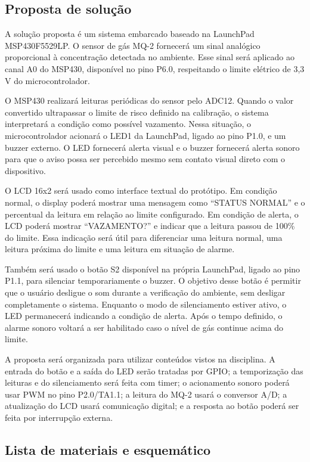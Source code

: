 \documentclass[11pt,a4paper]{article}
\numberwithin{equation}{section}
\begin{document}
\subsection{Proposta de solução}

A solução proposta é um sistema embarcado baseado na LaunchPad MSP430F5529LP. O sensor de gás MQ-2
fornecerá um sinal analógico proporcional à concentração detectada no ambiente. Esse sinal será
aplicado ao canal A0 do MSP430, disponível no pino P6.0, respeitando o limite elétrico de 3,3 V do
microcontrolador.

O MSP430 realizará leituras periódicas do sensor pelo ADC12. Quando o valor convertido ultrapassar o
limite de risco definido na calibração, o sistema interpretará a condição como possível vazamento.
Nessa situação, o microcontrolador acionará o LED1 da LaunchPad, ligado ao pino P1.0, e um buzzer
externo. O LED fornecerá alerta visual e o buzzer fornecerá alerta sonoro para que o aviso possa ser
percebido mesmo sem contato visual direto com o dispositivo.

O LCD 16x2 será usado como interface textual do protótipo. Em condição normal, o display poderá
mostrar uma mensagem como ``STATUS NORMAL'' e o percentual da leitura em relação ao limite
configurado. Em condição de alerta, o LCD poderá mostrar ``VAZAMENTO?'' e indicar que a leitura passou
de 100\% do limite. Essa indicação será útil para diferenciar uma leitura normal, uma leitura próxima
do limite e uma leitura em situação de alarme.

Também será usado o botão S2 disponível na própria LaunchPad, ligado ao pino P1.1, para silenciar
temporariamente o buzzer. O objetivo desse botão é permitir que o usuário desligue o som durante a
verificação do ambiente, sem desligar completamente o sistema. Enquanto o modo de silenciamento
estiver ativo, o LED permanecerá indicando a condição de alerta. Após o tempo definido, o alarme
sonoro voltará a ser habilitado caso o nível de gás continue acima do limite.

A proposta será organizada para utilizar conteúdos vistos na disciplina. A entrada do botão e a saída
do LED serão tratadas por GPIO; a temporização das leituras e do silenciamento será feita com timer; o
acionamento sonoro poderá usar PWM no pino P2.0/TA1.1; a leitura do MQ-2 usará o conversor A/D; a
atualização do LCD usará comunicação digital; e a resposta ao botão poderá ser feita por interrupção
externa.

\subsection{Lista de materiais e esquemático}
\end{document}
